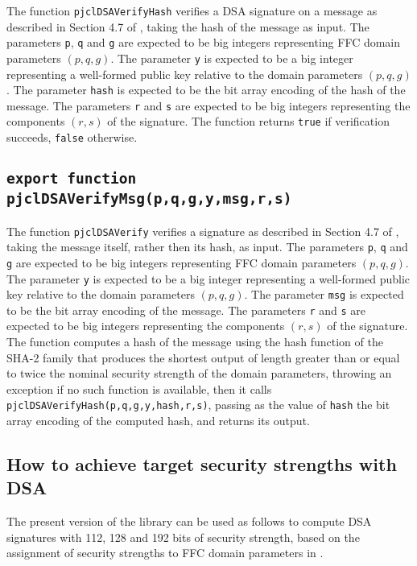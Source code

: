 \documentclass[12pt]{article}
\begin{document}
The function {\tt pjclDSAVerifyHash} verifies a DSA signature on a message as described in
Section 4.7 of \cite{DSS-4}, taking the hash of the message as input.
The parameters {\tt p}, {\tt q} and {\tt g} are expected to be big integers 
representing FFC domain parameters $(p,q,g)$.
The parameter {\tt y} is expected to be a big integer
representing a well-formed public key relative to the domain parameters $(p,q,g)$.
The parameter {\tt hash} is expected to be the bit array encoding of the
hash of the message.
The parameters {\tt r} and {\tt s} are expected to be big integers
representing the components $(r,s)$ of the signature.
The function returns
{\tt true} if verification succeeds, {\tt false} otherwise.

\subsection{\tt export function pjclDSAVerifyMsg(p,q,g,y,msg,r,s)}

The function {\tt pjclDSAVerify} verifies a signature as described in
Section 4.7 of \cite{DSS-4}, taking the message itself, rather then its hash, as input.
The parameters {\tt p}, {\tt q} and {\tt g} are expected to be big integers 
representing FFC domain parameters $(p,q,g)$.
The parameter {\tt y} is expected to be a big integer
representing a well-formed public key relative to the domain parameters $(p,q,g)$.
The parameter {\tt msg} is expected to be the bit array encoding of the message.
The parameters {\tt r} and {\tt s} are expected to be big integers
representing the components $(r,s)$ of the signature.
The function computes a hash of the message using the hash function of the 
SHA-2 family that produces the shortest output of length greater than or equal to 
twice the nominal security strength of the domain
parameters, throwing an exception if no such function is available, then it calls
{\tt pjclDSAVerifyHash(p,q,g,y,hash,r,s)}, passing as the value of {\tt hash}
the bit array encoding of the computed hash, and returns its output.

\subsection{How to achieve target security strengths with DSA}

The present version of the library can be used as follows to compute DSA signatures
with 112, 128 and 192 bits of security strength, based on the assignment of security
strengths to FFC domain parameters in \cite[Table 2, Column 3]{sp800-57part1rev4}.
\end{document}
